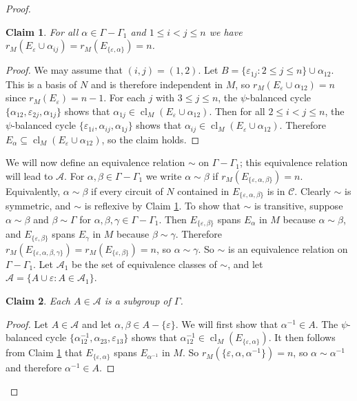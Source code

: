 \documentclass[12pt]{article}
\newtheorem{claim}{Claim}[theorem]
\theoremstyle{definition}
\newcommand{\cA}{\mathcal{A}}
\newcommand{\cC}{\mathcal{C}}
\newcommand{\ep}{\varepsilon}
\DeclareMathOperator{\cl}{cl}
\begin{document}
\begin{proof}
\begin{claim} \label{claim: sim is reflexive}
For all $\alpha \in \Gamma - \Gamma_1$ and $1 \le i < j \le n$ we have $r_M(E_{\ep} \cup \alpha_{ij}) = r_M(E_{\{\ep, \alpha\}}) = n$.
\end{claim}
\begin{proof}
We may assume that $(i,j) = (1,2)$.
Let $B = \{\ep_{1j} \colon 2 \le j \le n\} \cup \alpha_{12}$.
This is a basis of $N$ and is therefore independent in $M$, so $r_M(E_{\ep} \cup \alpha_{12}) = n$ since $r_M(E_{\ep}) = n - 1$.
For each $j$ with $3 \le j \le n$, the $\psi$-balanced cycle $\{\alpha_{12}, \ep_{2j}, \alpha_{1j}\}$ shows that $\alpha_{1j} \in \cl_M(E_{\ep} \cup \alpha_{12})$.
Then for all $2 \le i < j \le n$, the $\psi$-balanced cycle $\{\ep_{1i}, \alpha_{ij}, \alpha_{1j}\}$ shows that $\alpha_{ij} \in \cl_M(E_{\ep} \cup \alpha_{12})$.
Therefore $E_{\alpha} \subseteq \cl_M(E_{\ep} \cup \alpha_{12})$, so the claim holds.
\end{proof}

We will now define an equivalence relation $\sim$ on $\Gamma - \Gamma_1$; this equivalence relation will lead to $\cA$.
For $\alpha, \beta \in \Gamma - \Gamma_1$ we write $\alpha \sim \beta$ if 
$r_M(E_{\{\ep,\alpha, \beta\}}) = n$.
Equivalently, $\alpha \sim \beta$ if every circuit of $N$ contained in $E_{\{\ep,\alpha, \beta\}}$ is in $\cC$.
Clearly $\sim$ is symmetric, and $\sim$ is reflexive by Claim \ref{claim: sim is reflexive}.
To show that $\sim$ is transitive, suppose $\alpha \sim \beta$ and $\beta \sim \Gamma$ for $\alpha, \beta, \gamma \in \Gamma - \Gamma_1$.
Then $E_{\{\ep, \beta\}}$ spans $E_{\alpha}$ in $M$ because $\alpha \sim \beta$, and $E_{\{\ep, \beta\}}$ spans $E_{\gamma}$ in $M$ because $\beta \sim \gamma$.
Therefore $r_M(E_{\{\ep, \alpha, \beta, \gamma\}}) = r_M(E_{\{\ep, \beta\}}) = n$, so $\alpha \sim \gamma$.
So $\sim$ is an equivalence relation on $\Gamma - \Gamma_1$.
Let $\cA_1$ be the set of equivalence classes of $\sim$, and let $\cA = \{A \cup \ep \colon A \in \cA_1\}$.



\begin{claim} \label{claim: subgroup}
Each $A \in \cA$ is a subgroup of $\Gamma$.
\end{claim}
\begin{proof}
Let $A \in \cA$ and let $\alpha, \beta \in A - \{\ep\}$.
We will first show that $\alpha^{-1} \in A$.
The $\psi$-balanced cycle $\{\alpha^{-1}_{12}, \alpha_{23}, \ep_{13}\}$ shows that $\alpha^{-1}_{12} \in \cl_M(E_{\{\ep,\alpha\}})$.
It then follows from Claim \ref{claim: sim is reflexive} that $E_{\{\ep,\alpha\}}$ spans $E_{\alpha^{-1}}$ in $M$.
So $r_M(\{\ep, \alpha, \alpha^{-1}\}) = n$, so $\alpha \sim \alpha^{-1}$ and therefore $\alpha^{-1} \in A$.



\end{proof}
\end{proof}
\end{document}
